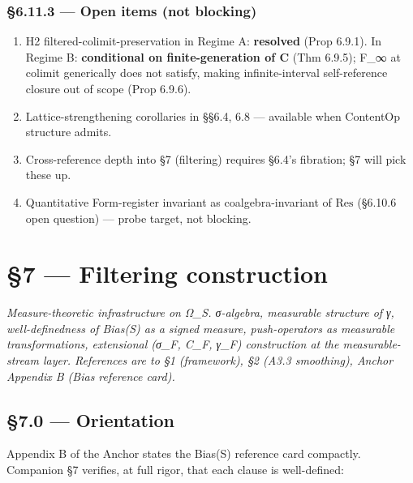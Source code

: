\documentclass[11pt, openany]{book}
\newcommand{\sectionbreak}{\clearpage}
\begin{document}
\subsection{§6.11.3 --- Open items (not blocking)}

\begin{enumerate}
\item H2 filtered-colimit-preservation in Regime A: \textbf{resolved} (Prop 6.9.1). In Regime B: \textbf{conditional on finite-generation of C} (Thm 6.9.5); F\_\allowbreak{}∞ at colimit generically does not satisfy, making infinite-interval self-reference closure out of scope (Prop 6.9.6).
\item Lattice-strengthening corollaries in §§6.4, 6.8 --- available when ContentOp structure admits.
\item Cross-reference depth into §7 (filtering) requires §6.4's fibration; §7 will pick these up.
\item Quantitative Form-register invariant as coalgebra-invariant of $\mathrm{Res}$ (§6.10.6 open question) --- probe target, not blocking.
\end{enumerate}

\sectionbreak

\sectionbreak


\chapter{§7 — Filtering construction}


\textit{Measure-theoretic infrastructure on Ω\_\allowbreak{}S. σ-algebra, measurable structure of γ, well-definedness of Bias(S) as a signed measure, push-operators as measurable transformations, extensional (σ\_\allowbreak{}F, C\_\allowbreak{}F, γ\_\allowbreak{}F) construction at the measurable-stream layer. References are to §1 (framework), §2 (A3.3 smoothing), Anchor Appendix B (Bias reference card).}

\sectionbreak

\section{§7.0 --- Orientation}

Appendix B of the Anchor states the Bias(S) reference card compactly. Companion §7 verifies, at full rigor, that each clause is well-defined:
\end{document}
